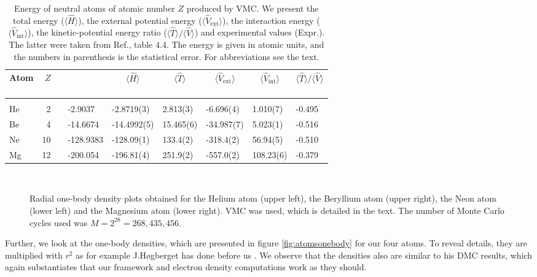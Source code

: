\begin{table}
	\caption{Energy of neutral atoms of atomic number $Z$ produced by VMC. We present the total energy ($\langle\hat{H}\rangle$), the external potential energy ($\langle\hat{V}_{\text{ext}}\rangle$), the interaction energy ($\langle\hat{V}_{\text{int}}\rangle$), the kinetic-potential energy ratio ($\langle\hat{T}\rangle/\langle\hat{V}\rangle$) and experimental values (Expr.). The latter were taken from Ref.\cite{degroote_faddeev_2013}, table 4.4. The energy is given in atomic units, and the numbers in parenthesis is the statistical error. For abbreviations see the text.}
	\label{tab:atomswinteraction}
	\begin{tabularx}{\textwidth}{lrrR{2cm}R{1.9cm}|R{1.8cm}R{1.8cm}R{1.8cm}R{1.7cm}} \hline\hline
		Atom & $Z$ & \makecell{\\ \phantom{=} \\ \phantom{=}} & 
		 &  &  &  &  &  \\ \hline \\
		
		He & 2 && -2.9037 & -2.8719(3) & 2.813(3) & -6.696(4) & 1.010(7) & -0.495 \\
		Be & 4 && -14.6674 & -14.4992(5) & 15.465(6) & -34.987(7) & 5.023(1) & -0.516 \\
		Ne & 10 && -128.9383 & -128.09(1) & 133.4(2) & -318.4(2) & 56.94(5) & -0.510 \\ 
		Mg & 12 && -200.054 & -196.81(4) & 251.9(2) & -557.0(2) & 108.23(6) & -0.379 \\ \hline\hline
	\end{tabularx}
\end{table}
\begin{figure}
	\centering
	\captionsetup[subfigure]{labelformat=empty}
	\\
	\caption{Radial one-body density plots obtained for the Helium atom (upper left), the Beryllium atom (upper right), the Neon atom (lower left) and the Magnesium atom (lower right). VMC was used, which is detailed in the text. The number of Monte Carlo cycles used was $M=2^{28}=268,435,456$.}
	\label{fig:atomsonebody}
\end{figure}
Further, we look at the one-body densities, which are presented in figure \eqref{fig:atomsonebody} for our four atoms. To reveal details, they are multiplied with $r^2$ as for example J.Høgberget has done before us \cite{hogberget_quantum_2013}. We observe that the densities also are similar to his DMC results, which again substantiates that our framework and electron density computations work as they should. 

